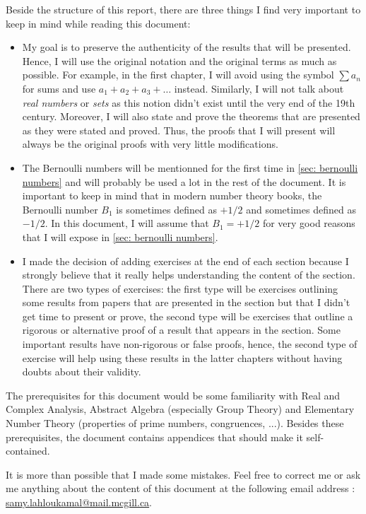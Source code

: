 \documentclass[oneside, 12pt]{book}
\theoremstyle{plain}
\theoremstyle{definition}
\numberwithin{equation}{section}
\begin{document}
Beside the structure of this report, there are three things I find very important to keep in mind while reading this document:
\begin{itemize}
    \item My goal is to preserve the authenticity of the results that will be presented. Hence, I will use the original notation and the original terms as much as possible. For example, in the first chapter, I will avoid using the symbol $\sum a_n$ for sums and use $a_1 + a_2 + a_3 + \dots$ instead. Similarly, I will not talk about \textit{real numbers} or \textit{sets} as this notion didn't exist until the very end of the 19th century. Moreover, I will also state and prove the theorems that are presented as they were stated and proved. Thus, the proofs that I will present will always be the original proofs with very little modifications.
    \item The Bernoulli numbers will be mentionned for the first time in \autoref{sec: bernoulli numbers} and will probably be used a lot in the rest of the document. It is important to keep in mind that in modern number theory books, the Bernoulli number $B_1$ is sometimes defined as $+1/2$ and sometimes defined as $-1/2$. In this document, I will assume that $B_1 = + 1/2$ for very good reasons that I will expose in \autoref{sec: bernoulli numbers}.
    \item I made the decision of adding exercises at the end of each section because I strongly believe that it really helps understanding the content of the section. There are two types of exercises: the first type will be exercises outlining some results from papers that are presented in the section but that I didn't get time to present or prove, the second type will be exercises that outline a rigorous or alternative proof of a result that appears in the section. Some important results have non-rigorous or false proofs, hence, the second type of exercise will help using these results in the latter chapters without having doubts about their validity.
\end{itemize}

The prerequisites for this document would be some familiarity with Real and Complex Analysis, Abstract Algebra (especially Group Theory) and Elementary Number Theory (properties of prime numbers, congruences, ...). Besides these prerequisites, the document contains appendices that should make it self-contained.

It is more than possible that I made some mistakes. Feel free to correct me or ask me anything about the content of this document at the following email address : \href{mailto:samy.lahloukamal@mail.mcgill.ca}{samy.lahloukamal@mail.mcgill.ca}.
\end{document}

